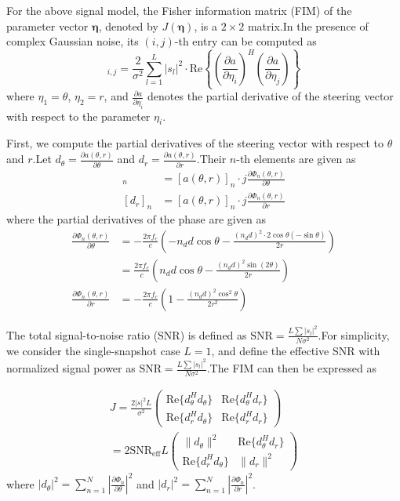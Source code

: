 \documentclass[lettersize,journal]{IEEEtran}
\begin{document}
{For the above signal model, the Fisher information matrix (FIM) of the parameter vector $\boldsymbol{\eta}$, denoted by $J(\boldsymbol{\eta})$, is a $2 \times 2$ matrix.In the presence of complex Gaussian noise, its $(i,j)$-th entry can be computed as
\begin{equation}
		[J(\boldsymbol{\eta})]_{i,j} = \frac{2}{\sigma^2} \sum_{l=1}^{L} |s_l|^2 \cdot \text{Re} \left\{ \left(\frac{\partial a}{\partial \eta_i}\right)^H \left(\frac{\partial a}{\partial \eta_j}\right) \right\}
\end{equation}
where $\eta_1 = \theta$, $\eta_2 = r$, and $\tfrac{\partial a}{\partial \eta_i}$ denotes the partial derivative of the steering vector with respect to the parameter $\eta_i$.

First, we compute the partial derivatives of the steering vector with respect to $\theta$ and $r$.Let $d_\theta = \tfrac{\partial a(\theta, r)}{\partial \theta}$ and $d_r = \tfrac{\partial a(\theta, r)}{\partial r}$.Their $n$-th elements are given as
\begin{align}
		[d_\theta]_n &= [a(\theta, r)]_n \cdot j \frac{\partial \Phi_n(\theta, r)}{\partial \theta} \\
		[d_r]_n &= [a(\theta, r)]_n \cdot j \frac{\partial \Phi_n(\theta, r)}{\partial r}
\end{align}
where the partial derivatives of the phase are given as
\begin{align}
		\frac{\partial \Phi_n(\theta, r)}{\partial \theta} &= -\frac{2\pi f_c}{c} \left( -n_d d \cos\theta - \frac{(n_d d)^2 \cdot 2\cos\theta(-\sin\theta)}{2r} \right) \nonumber \\
		&= \frac{2\pi f_c}{c} \left( n_d d \cos\theta - \frac{(n_d d)^2 \sin(2\theta)}{2r} \right) \\
		\frac{\partial \Phi_n(\theta, r)}{\partial r} &= -\frac{2\pi f_c}{c} \left( 1 - \frac{(n_d d)^2 \cos^2\theta}{2r^2} \right)
\end{align}

The total signal-to-noise ratio (SNR) is defined as $\text{SNR} = \frac{L \sum|s_l|^2}{N\sigma^2}$.For simplicity, we consider the single-snapshot case $L=1$, and define the effective SNR with normalized signal power as $\text{SNR} = \frac{L \sum|s_l|^2}{N\sigma^2}$.The FIM can then be expressed as


\begin{multline}
    J = \frac{2|s|^2 L}{\sigma^2} \begin{pmatrix}
        \text{Re}\{d_\theta^H d_\theta\} & \text{Re}\{d_\theta^H d_r\} \\
        \text{Re}\{d_r^H d_\theta\} & \text{Re}\{d_r^H d_r\}
    \end{pmatrix} \\
    = 2 \text{SNR}_{\text{eff}} L \begin{pmatrix}
        \|d_\theta\|^2 & \text{Re}\{d_\theta^H d_r\} \\
        \text{Re}\{d_r^H d_\theta\} & \|d_r\|^2
    \end{pmatrix}
\end{multline}
where $|d_\theta|^2 = \sum_{n=1}^{N} \left|\tfrac{\partial \Phi_n}{\partial \theta}\right|^2$ and $|d_r|^2 = \sum_{n=1}^{N} \left|\tfrac{\partial \Phi_n}{\partial r}\right|^2$.

}
\end{document}
